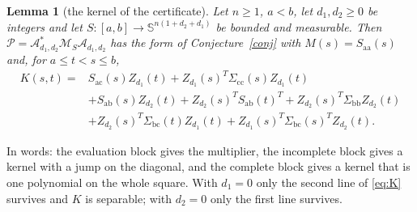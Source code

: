 \documentclass[12pt]{article}
\newcommand{\Sym}{\mathbb{S}}
\newcommand{\mcl}[1]{\mathcal{#1}}
\newcommand{\ba}{\mathrm{a}}
\newcommand{\bb}{\mathrm{b}}
\newcommand{\bc}{\mathrm{c}}
\theoremstyle{plain}
\newtheorem{lemma}[theorem]{Lemma}
\theoremstyle{definition}
\theoremstyle{remark}
\begin{document}
\begin{lemma}[the kernel of the certificate]\label{lem:kernel}
Let $n\ge1$, $a<b$, let $d_1,d_2\ge0$ be integers and let $S:[a,b]\to\Sym^{n(1+d_2+d_1)}$ be bounded and measurable. Then $\mcl P=\mcl A_{d_1,d_2}^*\mcl M_S\mcl A_{d_1,d_2}$ has the form of Conjecture~\ref{conj} with $M(s)=S_{\ba\ba}(s)$ and, for $a\le t<s\le b$,
\begin{equation}\label{eq:K}
\begin{aligned}
K(s,t)={}&S_{\ba\bc}(s)Z_{d_1}(t)+Z_{d_1}(s)^T\Sigma_{\bc\bc}(s)Z_{d_1}(t)\\
&+S_{\ba\bb}(s)Z_{d_2}(t)+Z_{d_2}(s)^TS_{\ba\bb}(t)^T+Z_{d_2}(s)^T\Sigma_{\bb\bb}Z_{d_2}(t)\\
&+Z_{d_2}(s)^T\Sigma_{\bb\bc}(t)Z_{d_1}(t)+Z_{d_1}(s)^T\Sigma_{\bb\bc}(s)^TZ_{d_2}(t).
\end{aligned}
\end{equation}
\end{lemma}
In words: the evaluation block gives the multiplier, the incomplete block gives a kernel with a jump on the diagonal, and the complete block gives a kernel that is one polynomial on the whole square. With $d_1=0$ only the second line of \eqref{eq:K} survives and $K$ is separable; with $d_2=0$ only the first line survives.
\end{document}
